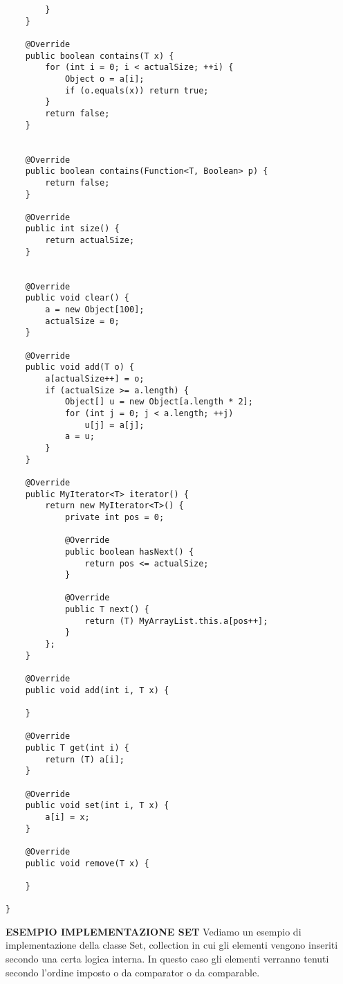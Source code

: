 \begin{lstlisting}
        }
    }

    @Override
    public boolean contains(T x) {
        for (int i = 0; i < actualSize; ++i) {
            Object o = a[i];
            if (o.equals(x)) return true;
        }
        return false;
    }


    @Override
    public boolean contains(Function<T, Boolean> p) {
        return false;
    }

    @Override
    public int size() {
        return actualSize;
    }


    @Override
    public void clear() {
        a = new Object[100];
        actualSize = 0;
    }

    @Override
    public void add(T o) {
        a[actualSize++] = o;
        if (actualSize >= a.length) {
            Object[] u = new Object[a.length * 2];
            for (int j = 0; j < a.length; ++j)
                u[j] = a[j];
            a = u;
        }
    }

    @Override
    public MyIterator<T> iterator() {
        return new MyIterator<T>() {
            private int pos = 0;

            @Override
            public boolean hasNext() {
                return pos <= actualSize;
            }

            @Override
            public T next() {
                return (T) MyArrayList.this.a[pos++];
            }
        };
    }

    @Override
    public void add(int i, T x) {

    }

    @Override
    public T get(int i) {
        return (T) a[i];
    }

    @Override
    public void set(int i, T x) {
        a[i] = x;
    }

    @Override
    public void remove(T x) {

    }

}
\end{lstlisting}

\noindent \textbf{ESEMPIO IMPLEMENTAZIONE SET}\newline
Vediamo un esempio di implementazione della classe Set, collection in cui gli elementi vengono inseriti secondo una certa logica interna. In questo caso gli elementi verranno tenuti secondo l'ordine imposto o da comparator o da comparable.

